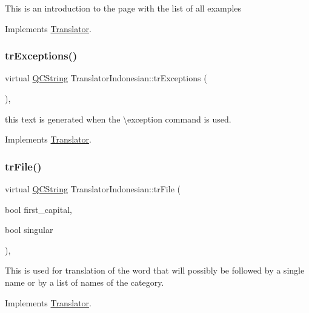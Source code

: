 This is an introduction to the page with the list of all examples 

Implements \mbox{\hyperlink{class_translator}{Translator}}.

\mbox{\label{class_translator_indonesian_a2f43a12b6fb90eb18ae847c9de2f9a84}} 
\subsubsection{\texorpdfstring{trExceptions()}{trExceptions()}}
{\footnotesize\ttfamily virtual \mbox{\hyperlink{class_q_c_string}{Q\+C\+String}} Translator\+Indonesian\+::tr\+Exceptions (\begin{DoxyParamCaption}{ }\end{DoxyParamCaption})\hspace{0.3cm}{\ttfamily [inline]}, {\ttfamily [virtual]}}

this text is generated when the \textbackslash{}exception command is used. 

Implements \mbox{\hyperlink{class_translator}{Translator}}.

\mbox{\label{class_translator_indonesian_ac01ac6ecd08ab3bfc276f02fec564c8c}} 
\subsubsection{\texorpdfstring{trFile()}{trFile()}}
{\footnotesize\ttfamily virtual \mbox{\hyperlink{class_q_c_string}{Q\+C\+String}} Translator\+Indonesian\+::tr\+File (\begin{DoxyParamCaption}\item[{bool}]{first\+\_\+capital,  }\item[{bool}]{singular }\end{DoxyParamCaption})\hspace{0.3cm}{\ttfamily [inline]}, {\ttfamily [virtual]}}

This is used for translation of the word that will possibly be followed by a single name or by a list of names of the category. 

Implements \mbox{\hyperlink{class_translator}{Translator}}.

